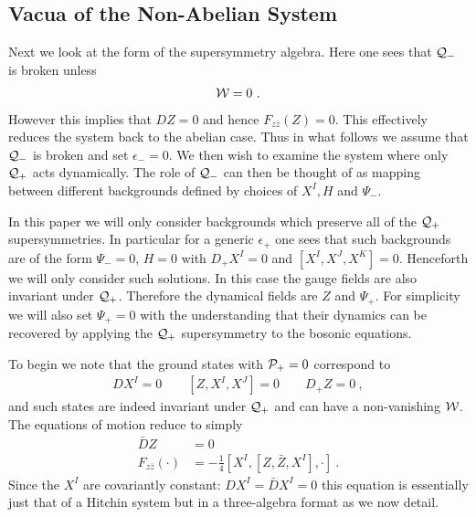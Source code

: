 \documentclass[12pt]{article}
\newcommand{\nn}{\nonumber}
\numberwithin{equation}{section}
\begin{document}
\subsection{Vacua of the Non-Abelian System}

Next we look at the form of the supersymmetry algebra. Here one sees that ${\cal Q}_-$ is broken unless
\begin{align}
{\cal W}=0\ .
\end{align}
However this implies that $DZ=0$ and hence $F_{z\bar z}(Z)=0$. This effectively reduces the system back to the abelian case. Thus in what follows we assume that ${\cal Q}_-$ is broken and set $\epsilon_-=0$. We then wish to examine the system where only ${\cal Q}_+$ acts dynamically.    The role of ${\cal Q}_-$ can then be thought of as mapping between different backgrounds defined by choices of $X^I, H$ and $\Psi_-$. 

In this paper we will only consider backgrounds which preserve all of the ${\cal Q}_+$ supersymmetries.
In particular for a generic $\epsilon_+$ one sees that such   backgrounds are of the form $\Psi_-=0$, $H=0$ with $D_+X^I=0$ and $[X^I,X^J,X^K]=0$. Henceforth we will only consider such solutions. In this case the gauge fields are also invariant under ${\cal Q}_+$. Therefore the dynamical fields are $Z$ and $\Psi_+$. For simplicity we will also set $\Psi_+=0$ with the understanding that their dynamics can be recovered by applying the ${\cal Q}_+$ supersymmetry to the bosonic equations.  


To begin we note that the ground states with ${\cal P}_+=0$ correspond to
\begin{align}
DX^I = 0\qquad [Z, X^I,X^J]=0\qquad D_+Z=0\ ,
\end{align}
 and such states are indeed invariant under ${\cal Q}_+$ and can have a non-vanishing ${\cal W}$. The equations of motion reduce to simply
 \begin{align}
 \bar D Z & =0 \nn\\
 F_{z \bar{z}} (\cdot) &=     - \frac{1}{4 }   \left[ X^I, \left[Z, \bar{Z}, X^I  \right], \cdot \right]\ .
 \end{align}
Since the $X^I$ are covariantly constant: $DX^I=\bar D X^I=0$ this equation is essentially just that of a Hitchin system \cite{Hitchin:1986vp} but in a three-algebra format as we now detail.
\end{document}
